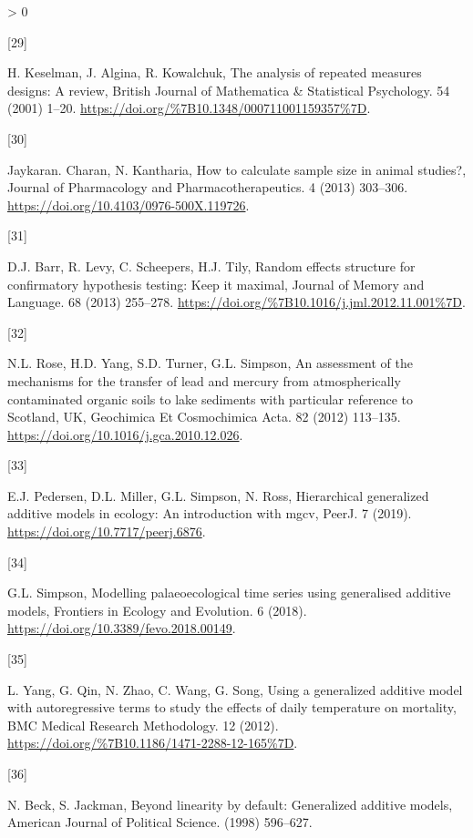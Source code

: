 \documentclass[
]{article}
\newlength{\cslhangindent}
\newlength{\csllabelwidth}
\newenvironment{CSLReferences}[2] %
 {%
  \setlength{\parindent}{0pt}
  \ifodd #1 \everypar{\setlength{\hangindent}{\cslhangindent}}\ignorespaces\fi
  \ifnum #2 > 0
  \setlength{\parskip}{#2\baselineskip}
  \fi
 }%
 {}
\newcommand{\CSLLeftMargin}[1]{\parbox[t]{\csllabelwidth}{#1}}
\newcommand{\CSLRightInline}[1]{\parbox[t]{\linewidth - \csllabelwidth}{#1}\break}
\begin{document}
\begin{CSLReferences}{0}{0}
\leavevmode\hypertarget{ref-keselman2001}{}%
\CSLLeftMargin{{[}29{]} }
\CSLRightInline{H. Keselman, J. Algina, R. Kowalchuk, {The analysis of repeated measures designs: A review}, {British Journal of Mathematica \& Statistical Psychology}. {54} (2001) 1--20. \url{https://doi.org/\%7B10.1348/000711001159357\%7D}.}

\leavevmode\hypertarget{ref-charan2013}{}%
\CSLLeftMargin{{[}30{]} }
\CSLRightInline{Jaykaran. Charan, N. Kantharia, {How to calculate sample size in animal studies?}, Journal of Pharmacology and Pharmacotherapeutics. 4 (2013) 303--306. \url{https://doi.org/10.4103/0976-500X.119726}.}

\leavevmode\hypertarget{ref-barr2013}{}%
\CSLLeftMargin{{[}31{]} }
\CSLRightInline{D.J. Barr, R. Levy, C. Scheepers, H.J. Tily, {Random effects structure for confirmatory hypothesis testing: Keep it maximal}, {Journal of Memory and Language}. {68} (2013) 255--278. \url{https://doi.org/\%7B10.1016/j.jml.2012.11.001\%7D}.}

\leavevmode\hypertarget{ref-rose2012}{}%
\CSLLeftMargin{{[}32{]} }
\CSLRightInline{N.L. Rose, H.D. Yang, S.D. Turner, G.L. Simpson, {An assessment of the mechanisms for the transfer of lead and mercury from atmospherically contaminated organic soils to lake sediments with particular reference to Scotland, UK}, Geochimica Et Cosmochimica Acta. 82 (2012) 113--135. \url{https://doi.org/10.1016/j.gca.2010.12.026}.}

\leavevmode\hypertarget{ref-pedersen2019}{}%
\CSLLeftMargin{{[}33{]} }
\CSLRightInline{E.J. Pedersen, D.L. Miller, G.L. Simpson, N. Ross, Hierarchical generalized additive models in ecology: An introduction with mgcv, {PeerJ}. 7 (2019). \url{https://doi.org/10.7717/peerj.6876}.}

\leavevmode\hypertarget{ref-simpson2018}{}%
\CSLLeftMargin{{[}34{]} }
\CSLRightInline{G.L. Simpson, Modelling palaeoecological time series using generalised additive models, Frontiers in Ecology and Evolution. 6 (2018). \url{https://doi.org/10.3389/fevo.2018.00149}.}

\leavevmode\hypertarget{ref-yang2012}{}%
\CSLLeftMargin{{[}35{]} }
\CSLRightInline{L. Yang, G. Qin, N. Zhao, C. Wang, G. Song, {Using a generalized additive model with autoregressive terms to study the effects of daily temperature on mortality}, {BMC Medical Research Methodology}. {12} (2012). \url{https://doi.org/\%7B10.1186/1471-2288-12-165\%7D}.}

\leavevmode\hypertarget{ref-beck1998}{}%
\CSLLeftMargin{{[}36{]} }
\CSLRightInline{N. Beck, S. Jackman, Beyond linearity by default: Generalized additive models, American Journal of Political Science. (1998) 596--627.}


\end{CSLReferences}
\end{document}
